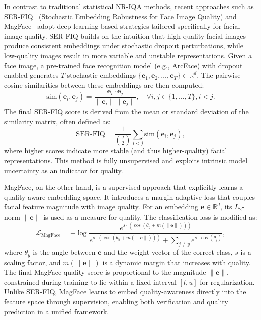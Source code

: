 In contrast to traditional statistical NR-IQA methods, recent approaches such as SER-FIQ~\cite{terhorst2020serfiq} (Stochastic Embedding Robustness for Face Image Quality) and MagFace~\cite{meng2021magface} adopt deep learning-based strategies tailored specifically for facial image quality. SER-FIQ builds on the intuition that high-quality facial images produce consistent embeddings under stochastic dropout perturbations, while low-quality images result in more variable and unstable representations. Given a face image, a pre-trained face recognition model (e.g., ArcFace) with dropout enabled generates $T$ stochastic embeddings $\{\mathbf{e}_1, \mathbf{e}_2, \dots, \mathbf{e}_T\} \in \mathbb{R}^d$. The pairwise cosine similarities between these embeddings are then computed:
\begin{equation}
\text{sim}(\mathbf{e}_i, \mathbf{e}_j) = \frac{\mathbf{e}_i \cdot \mathbf{e}_j}{\|\mathbf{e}_i\| \|\mathbf{e}_j\|}, \quad \forall i,j \in \{1,\dots,T\}, i < j.
\end{equation}
The final SER-FIQ score is derived from the mean or standard deviation of the similarity matrix, often defined as:
\begin{equation}
\text{SER-FIQ} = \frac{1}{\binom{T}{2}} \sum_{i<j} \text{sim}(\mathbf{e}_i, \mathbf{e}_j),
\end{equation}
where higher scores indicate more stable (and thus higher-quality) facial representations. This method is fully unsupervised and exploits intrinsic model uncertainty as an indicator for quality.

MagFace, on the other hand, is a supervised approach that explicitly learns a quality-aware embedding space. It introduces a margin-adaptive loss that couples facial feature magnitude with image quality. For an embedding \( \mathbf{e} \in \mathbb{R}^d \), its \( L_2 \)-norm \( \|\mathbf{e}\| \) is used as a measure for quality. The classification loss is modified as:
\begin{equation}
\mathcal{L}_{\text{MagFace}} = -\log \frac{e^{s \cdot (\cos(\theta_y + m(\|\mathbf{e}\|)))}}{e^{s \cdot (\cos(\theta_y + m(\|\mathbf{e}\|)))} + \sum_{j \neq y} e^{s \cdot \cos(\theta_j)}},
\end{equation}
where \( \theta_y \) is the angle between \( \mathbf{e} \) and the weight vector of the correct class, \( s \) is a scaling factor, and \( m(\|\mathbf{e}\|) \) is a dynamic margin that increases with quality. The final MagFace quality score is proportional to the magnitude \( \|\mathbf{e}\| \), constrained during training to lie within a fixed interval \([l, u]\) for regularization. Unlike SER-FIQ, MagFace learns to embed quality-awareness directly into the feature space through supervision, enabling both verification and quality prediction in a unified framework.


